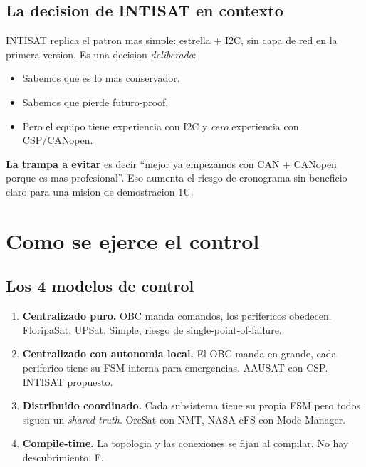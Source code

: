 \documentclass[11pt,a4paper,oneside,openright]{book}
\begin{document}
\section{La decision de INTISAT en contexto}

INTISAT replica el patron mas simple: estrella + I2C, sin capa de red
en la primera version. Es una decision \emph{deliberada}:

\begin{itemize}[leftmargin=2em]
  \item Sabemos que es lo mas conservador.
  \item Sabemos que pierde futuro-proof.
  \item Pero el equipo tiene experiencia con I2C y \emph{cero}
    experiencia con CSP/CANopen.
\end{itemize}

\textbf{La trampa a evitar} es decir ``mejor ya empezamos con CAN +
CANopen porque es mas profesional''. Eso aumenta el riesgo de cronograma
sin beneficio claro para una mision de demostracion 1U.

\chapter{Como se ejerce el control}

\section{Los 4 modelos de control}

\begin{enumerate}[leftmargin=2em]
  \item \textbf{Centralizado puro.} OBC manda comandos, los perifericos
    obedecen. FloripaSat, UPSat. Simple, riesgo de single-point-of-failure.
  \item \textbf{Centralizado con autonomia local.} El OBC manda en
    grande, cada periferico tiene su FSM interna para emergencias.
    AAUSAT con CSP. INTISAT propuesto.
  \item \textbf{Distribuido coordinado.} Cada subsistema tiene su
    propia FSM pero todos siguen un \emph{shared truth}. OreSat con NMT,
    NASA cFS con Mode Manager.
  \item \textbf{Compile-time.} La topologia y las conexiones se fijan
    al compilar. No hay descubrimiento. F\textquotesingle{}.
\end{enumerate}
\end{document}
